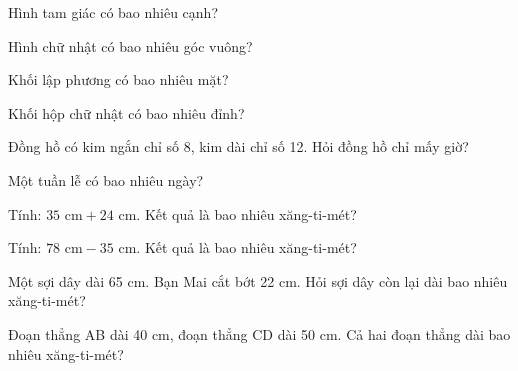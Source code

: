 \begin{ex}
Hình tam giác có bao nhiêu cạnh?
\end{ex}

\begin{ex}
Hình chữ nhật có bao nhiêu góc vuông?
\end{ex}

\begin{ex}
Khối lập phương có bao nhiêu mặt?
\end{ex}

\begin{ex}
Khối hộp chữ nhật có bao nhiêu đỉnh?
\end{ex}

\begin{ex}
Đồng hồ có kim ngắn chỉ số 8, kim dài chỉ số 12. Hỏi đồng hồ chỉ mấy giờ?
\end{ex}

\begin{ex}
Một tuần lễ có bao nhiêu ngày?
\end{ex}

\begin{ex}
Tính: $35\text{ cm} + 24\text{ cm}$. Kết quả là bao nhiêu xăng-ti-mét?
\end{ex}

\begin{ex}
Tính: $78\text{ cm} - 35\text{ cm}$. Kết quả là bao nhiêu xăng-ti-mét?
\end{ex}

\begin{ex}
Một sợi dây dài 65 cm. Bạn Mai cắt bớt 22 cm. Hỏi sợi dây còn lại dài bao nhiêu xăng-ti-mét?
\end{ex}

\begin{ex}
Đoạn thẳng AB dài 40 cm, đoạn thẳng CD dài 50 cm. Cả hai đoạn thẳng dài bao nhiêu xăng-ti-mét?
\end{ex}


